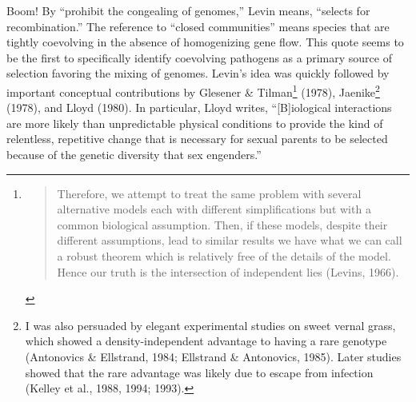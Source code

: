 \documentclass[
  letterpaper,
]{book}
\begin{document}
Boom! By ``prohibit the congealing of genomes,'' Levin means, ``selects
for recombination.'' The reference to ``closed communities'' means
species that are tightly coevolving in the absence of homogenizing gene
flow. This quote seems to be the first to specifically identify
coevolving pathogens as a primary source of selection favoring the
mixing of genomes. Levin's idea was quickly followed by important
conceptual contributions by Glesener \& Tilman\footnote{\begin{quote}
  Therefore, we attempt to treat the same problem with several
  alternative models each with different simplifications but with a
  common biological assumption. Then, if these models, despite their
  different assumptions, lead to similar results we have what we can
  call a robust theorem which is relatively free of the details of the
  model. Hence our truth is the intersection of independent lies
  (Levins, 1966).
  \end{quote}} (1978), Jaenike\footnote{I was also persuaded by elegant
  experimental studies on sweet vernal grass, which showed a
  density-independent advantage to having a rare genotype (Antonovics \&
  Ellstrand, 1984; Ellstrand \& Antonovics, 1985). Later studies showed
  that the rare advantage was likely due to escape from infection
  (Kelley et al., 1988, 1994; 1993).} (1978), and Lloyd (1980). In
particular, Lloyd writes, ``{[}B{]}iological interactions are more
likely than unpredictable physical conditions to provide the kind of
relentless, repetitive change that is necessary for sexual parents to be
selected because of the genetic diversity that sex engenders.''
\end{document}
